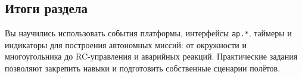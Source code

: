 \subsection*{Итоги раздела}
Вы научились использовать события платформы, интерфейсы \texttt{ap.*}, таймеры и индикаторы для построения автономных миссий: от окружности и многоугольника до RC‑управления и аварийных реакций. Практические задания позволяют закрепить навыки и подготовить собственные сценарии полётов.
